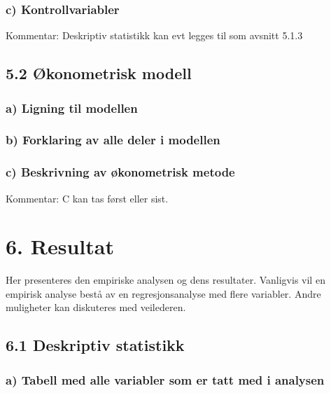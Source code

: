 \documentclass[
  11pt,
  a4paper,
  DIV=11,
  numbers=noendperiod]{scrartcl}
\begin{document}
\subsubsection{c) Kontrollvariabler}\label{c-kontrollvariabler}

Kommentar: Deskriptiv statistikk kan evt legges til som avsnitt 5.1.3

\subsection{5.2 Økonometrisk modell}\label{uxf8konometrisk-modell}

\subsubsection{a) Ligning til modellen}\label{a-ligning-til-modellen}

\subsubsection{b) Forklaring av alle deler i
modellen}\label{b-forklaring-av-alle-deler-i-modellen}

\subsubsection{c) Beskrivning av økonometrisk
metode}\label{c-beskrivning-av-uxf8konometrisk-metode}

Kommentar: C kan tas først eller sist.

\section{6. Resultat}\label{resultat}

Her presenteres den empiriske analysen og dens resultater. Vanligvis vil
en empirisk analyse bestå av en regresjonsanalyse med flere variabler.
Andre muligheter kan diskuteres med veilederen.

\subsection{6.1 Deskriptiv statistikk}\label{deskriptiv-statistikk}

\subsubsection{a) Tabell med alle variabler som er tatt med i
analysen}\label{a-tabell-med-alle-variabler-som-er-tatt-med-i-analysen}
\end{document}
